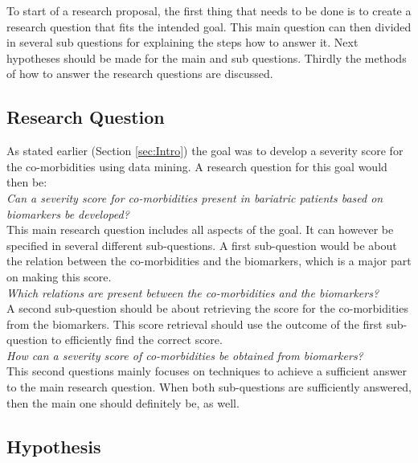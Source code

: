 \documentclass[10pt,a4paper]{article}
\begin{document}
	To start of a research proposal, the first thing that needs to be done is to create a research question that fits the intended goal. This main question can then divided in several sub questions for explaining the steps how to answer it. Next hypotheses should be made for the main and sub questions. Thirdly the methods of how to answer the research questions are discussed. 
	
	\subsection{Research Question}
	
	As stated earlier (Section \ref{sec:Intro}) the goal was to develop a severity score for the co-morbidities using data mining. A research question for this goal would then be:\\
	
	\emph{Can a severity score for co-morbidities present in bariatric patients based on biomarkers be developed?}\\
	
	This main research question includes all aspects of the goal. It can however be specified in several different sub-questions. A first sub-question would be about the relation between the co-morbidities and the biomarkers, which is a major part on making this score.\\
	
	\emph{Which relations are present between the co-morbidities and the biomarkers?}\\
	
	A second sub-question should be about retrieving the score for the co-morbidities from the biomarkers. This score retrieval should use the outcome of the first sub-question to efficiently find the correct score.\\
	
	\emph{How can a severity score of co-morbidities be obtained from biomarkers?}\\
	
	This second questions mainly focuses on techniques to achieve a sufficient answer to the main research question. When both sub-questions are sufficiently answered, then the main one should definitely be, as well.
	
	\subsection{Hypothesis}
	
\end{document}
